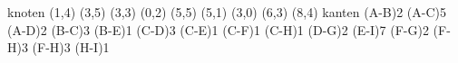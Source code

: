 \documentclass{lehramt-informatik-aufgabe}
\begin{document}
\graph knoten {
  (1,4)
  (3,5)
  (3,3)
  (0,2)
  (5,5)
  (5,1)
  (3,0)
  (6,3)
  (8,4)
} kanten {
  \kante(A-B){2}
  \kante(A-C){5}
  \kante(A-D){2}
  \kante(B-C){3}
  \kante(B-E){1}
  \kante(C-D){3}
  \kante(C-E){1}
  \kante(C-F){1}
  \kante(C-H){1}
  \kante(D-G){2}
  \kante(E-I){7}
  \kante(F-G){2}
  \kante(F-H){3}
  \kante(F-H){3}
  \kante(H-I){1}
}
\end{document}
